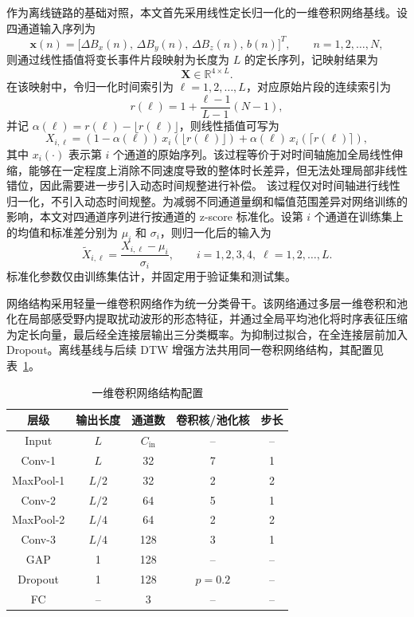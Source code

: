 \documentclass{xdupgthesis}
\begin{document}
作为离线链路的基础对照，本文首先采用线性定长归一化的一维卷积网络基线。设四通道输入序列为
\begin{equation}
    \mathbf{x}(n)=\big[\Delta B_x(n),\,\Delta B_y(n),\,\Delta B_z(n),\,b(n)\big]^T,\qquad n=1,2,\ldots,N,
\end{equation}
则通过线性插值将变长事件片段映射为长度为 $L$ 的定长序列，记映射结果为
\begin{equation}
    \mathbf{X}\in\mathbb{R}^{4\times L}.
\end{equation}
在该映射中，令归一化时间索引为 $\ell=1,2,\ldots,L$，对应原始片段的连续索引为
\begin{equation}
    r(\ell)=1+\frac{\ell-1}{L-1}(N-1),
\end{equation}
并记 $\alpha(\ell)=r(\ell)-\lfloor r(\ell)\rfloor$，则线性插值可写为
\begin{equation}
    X_{i,\ell}=(1-\alpha(\ell))\,x_i(\lfloor r(\ell)\rfloor)+\alpha(\ell)\,x_i(\lceil r(\ell)\rceil),
\end{equation}
其中 $x_i(\cdot)$ 表示第 $i$ 个通道的原始序列。该过程等价于对时间轴施加全局线性伸缩，能够在一定程度上消除不同速度导致的整体时长差异，但无法处理局部非线性错位，因此需要进一步引入动态时间规整进行补偿。
该过程仅对时间轴进行线性归一化，不引入动态时间规整。为减弱不同通道量纲和幅值范围差异对网络训练的影响，本文对四通道序列进行按通道的 z-score 标准化。设第 $i$ 个通道在训练集上的均值和标准差分别为 $\mu_i$ 和 $\sigma_i$，则归一化后的输入为
\begin{equation}
    \tilde{X}_{i,\ell}=\frac{X_{i,\ell}-\mu_i}{\sigma_i},\qquad i=1,2,3,4,\;\ell=1,2,\ldots,L.
\end{equation}
标准化参数仅由训练集估计，并固定用于验证集和测试集。

网络结构采用轻量一维卷积网络作为统一分类骨干。该网络通过多层一维卷积和池化在局部感受野内提取扰动波形的形态特征，并通过全局平均池化将时序表征压缩为定长向量，最后经全连接层输出三分类概率。为抑制过拟合，在全连接层前加入 Dropout。离线基线与后续 DTW 增强方法共用同一卷积网络结构，其配置见表~\ref{tab:ch3_cnn_arch}。

\begin{table}[!htbp]
\centering
\small
\caption{一维卷积网络结构配置}
\label{tab:ch3_cnn_arch}
\begin{tabular}{c c c c c}
\hline
层级 & 输出长度 & 通道数 & 卷积核/池化核 & 步长 \\
\hline
Input & $L$ & $C_{\mathrm{in}}$ & -- & -- \\
Conv-1 & $L$ & 32  & 7 & 1 \\
MaxPool-1 & $L/2$ & 32 & 2 & 2 \\
Conv-2 & $L/2$ & 64  & 5 & 1 \\
MaxPool-2 & $L/4$ & 64 & 2 & 2 \\
Conv-3 & $L/4$ & 128 & 3 & 1 \\
GAP & 1 & 128 & -- & -- \\
Dropout & 1 & 128 & $p=0.2$ & -- \\
FC & -- & 3 & -- & -- \\
\hline
\end{tabular}
\end{table}
\end{document}
